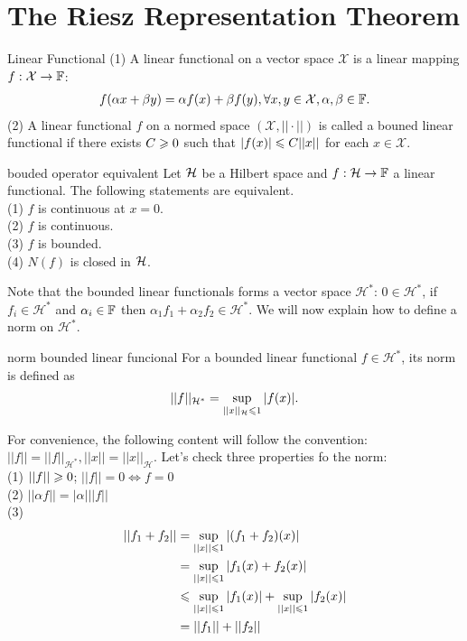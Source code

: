 \chapter{The Riesz Representation Theorem}\label{chp:1_3}


\begin{definition}{Linear Functional}{}
    (1) A linear functional on a vector space $\mathcal{X}$ is a linear mapping $f:\mathcal{X}\rightarrow \mathbb{F}$:
    \begin{align*}
        f(\alpha x+\beta y)= \alpha f(x)+\beta f(y), \forall x,y\in \mathcal{X}, \alpha,\beta \in \mathbb{F}.
    \end{align*}
    (2) A linear functional $f$ on a normed space $(\mathcal{X},||\cdot||)$ is called a bouned linear functional if
    there exists $C\geqslant 0$ such that $|f(x)|\leqslant C||x||$ for each $x\in \mathcal{X}$.      
\end{definition}


\begin{proposition}{}{bouded operator equivalent}
    Let $\mathcal{H}$ be a Hilbert space and $f:\mathcal{H}\rightarrow \mathbb{F}$ a linear functional. The following statements are equivalent.\\
    (1) $f$ is continuous at $x=0$.\\
    (2) $f$ is continuous.\\
    (3) $f$ is bounded.\\
    (4) $N(f)$ is closed in $\mathcal{H}$.
\end{proposition}

Note that the bounded linear functionals forms a vector space $\mathcal{H}^*$: $0\in \mathcal{H}^*$, if $f_i\in \mathcal{H}^*$ and $\alpha_i\in \mathbb{F}$ then
$\alpha_1f_1+\alpha_2f_2\in \mathcal{H}^*$. We will now explain how to define a norm on $\mathcal{H}^*$.

\begin{definition}{}{norm bounded linear funcional}
    For a bounded linear functional $f\in \mathcal{H}^*$, its norm is defined as 
    \begin{align*}
        ||f||_{\mathcal{H}^*} = \sup_{||x||_{\mathcal{H}}\leqslant 1}|f(x)|.
    \end{align*}
\end{definition}

For convenience, the following content will follow the convention: $||f||=||f||_{\mathcal{H}^*}, ||x||=||x||_{\mathcal{H}}$.
Let's check three properties fo the norm:\\
(1) $||f||\geqslant0$; $||f||=0\Leftrightarrow f=0$\\
(2) $||\alpha f|| =|\alpha| ||f||$\\
(3) \begin{align*}
    ||f_1+f_2|| &= \sup_{||x||\leqslant 1}|(f_1+f_2)(x)|\\
                &= \sup_{||x||\leqslant 1}|f_1(x)+f_2(x)|\\
                &\leqslant \sup_{||x||\leqslant 1}|f_1(x)| + \sup_{||x||\leqslant 1}|f_2(x)|\\
                &= ||f_1||+||f_2||
\end{align*}
    
